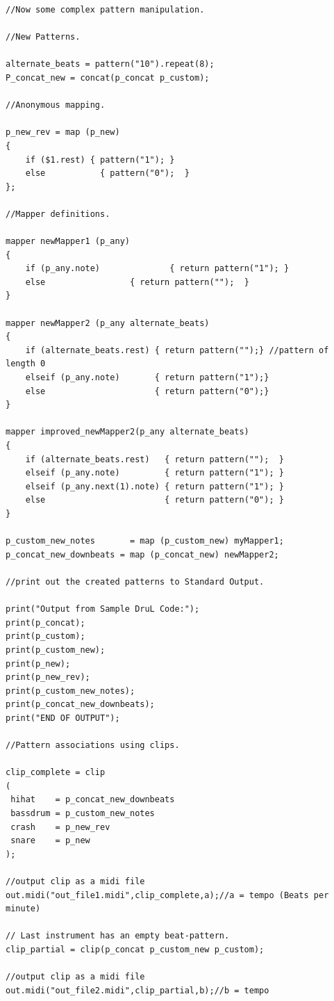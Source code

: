 \begin{verbatim}
//Now some complex pattern manipulation.

//New Patterns.

alternate_beats = pattern("10").repeat(8);
P_concat_new = concat(p_concat p_custom);

//Anonymous mapping.

p_new_rev = map (p_new)
{
    if ($1.rest) { pattern("1"); }
    else 	       { pattern("0");  }
};

//Mapper definitions. 

mapper newMapper1 (p_any)
{
    if (p_any.note) 			 { return pattern("1"); }
    else        	   	 { return pattern("");  }
}

mapper newMapper2 (p_any alternate_beats)
{
    if (alternate_beats.rest) { return pattern("");} //pattern of length 0
    elseif (p_any.note)       { return pattern("1");}
    else                      { return pattern("0");}
}

mapper improved_newMapper2(p_any alternate_beats)
{
    if (alternate_beats.rest)   { return pattern("");  }
    elseif (p_any.note)         { return pattern("1"); }
    elseif (p_any.next(1).note) { return pattern("1"); }
    else                        { return pattern("0"); }
}

p_custom_new_notes 		 = map (p_custom_new) myMapper1;
p_concat_new_downbeats = map (p_concat_new) newMapper2;

//print out the created patterns to Standard Output.

print("Output from Sample DruL Code:");
print(p_concat);
print(p_custom);
print(p_custom_new);
print(p_new);
print(p_new_rev);
print(p_custom_new_notes);
print(p_concat_new_downbeats);
print("END OF OUTPUT");

//Pattern associations using clips.

clip_complete = clip
(
 hihat    = p_concat_new_downbeats 
 bassdrum = p_custom_new_notes
 crash    = p_new_rev
 snare    = p_new
);

//output clip as a midi file
out.midi("out_file1.midi",clip_complete,a);//a = tempo (Beats per minute)

// Last instrument has an empty beat-pattern.
clip_partial = clip(p_concat p_custom_new p_custom);

//output clip as a midi file
out.midi("out_file2.midi",clip_partial,b);//b = tempo
\end{verbatim}
